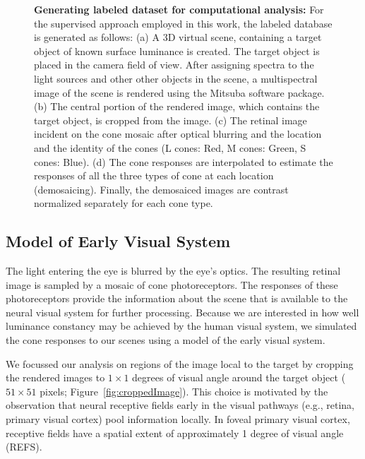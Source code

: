 \documentclass{jov}
\begin{document}
\begin{figure}
\begin{subfigure}[b]{0.2 \textwidth}
        \label{fig:coneContrast}
    \end{subfigure}
    \label{fig:sceneWithCroppedImage}
    \caption{{\bf Generating labeled dataset for computational analysis:}  For the supervised approach employed in this work, the labeled database is generated as follows: (a) A 3D virtual scene, containing a target object of known surface luminance is created. The target object is placed in the camera field of view. After assigning spectra to the light sources and other other objects in the scene, a multispectral image of the scene is rendered using the Mitsuba software package. (b) The central portion of the rendered image, which contains the target object, is cropped from the image. (c) The retinal image incident on the cone mosaic after optical blurring and the location and the identity of the cones (L cones: Red, M cones: Green, S cones: Blue).  (d) The cone responses are interpolated to estimate the responses of all the three types of cone at each location (demosaicing). Finally, the demosaiced images are contrast normalized separately for each cone type.}
\end{figure}

\subsection{Model of Early Visual System} \label{method:Isetbio}

The light entering the eye is blurred by the eye's optics.
The resulting retinal image is sampled by a mosaic of cone photoreceptors.
The responses of these photoreceptors provide the information about the scene that is available to the neural visual system for further processing.
Because we are interested in how well luminance constancy may be achieved by the human visual system, we simulated the cone responses
to our scenes using a model of the early visual system.

We focussed our analysis on regions of the image local to the target by cropping the rendered images to $1 \times 1$ degrees of visual angle around the target object ($51 \times 51$ pixels; Figure~\ref{fig:croppedImage}).
This choice is motivated by the observation that neural receptive fields early in the visual pathways (e.g., retina, primary visual cortex) pool information locally.
In foveal primary visual cortex, receptive fields have a spatial extent of approximately 1 degree of visual angle (REFS).
\end{document}

